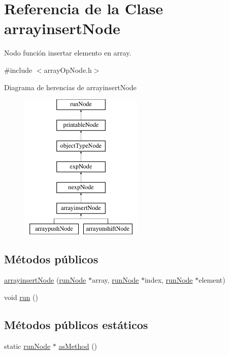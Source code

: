 \hypertarget{classarrayinsertNode}{\section{Referencia de la Clase arrayinsert\-Node}
\label{classarrayinsertNode}
}


Nodo función insertar elemento en array.  




{\ttfamily \#include $<$array\-Op\-Node.\-h$>$}

Diagrama de herencias de arrayinsert\-Node\begin{figure}[H]
\begin{center}
\leavevmode
\includegraphics[height=7.000000cm]{classarrayinsertNode}
\end{center}
\end{figure}
\subsection*{Métodos públicos}
\begin{DoxyCompactItemize}
\item 
\hyperlink{classarrayinsertNode_a018b6d84b64e515eea1016810ed335ac}{arrayinsert\-Node} (\hyperlink{classrunNode}{run\-Node} $\ast$array, \hyperlink{classrunNode}{run\-Node} $\ast$index, \hyperlink{classrunNode}{run\-Node} $\ast$element)
\item 
void \hyperlink{classarrayinsertNode_a1a72ddaf1ade1ee8a535ae1ca1fc2861}{run} ()
\end{DoxyCompactItemize}
\subsection*{Métodos públicos estáticos}
\begin{DoxyCompactItemize}
\item 
static \hyperlink{classrunNode}{run\-Node} $\ast$ \hyperlink{classarrayinsertNode_ab9edbaa7c002c24e3bedf5d2bd8ca5be}{as\-Method} ()
\end{DoxyCompactItemize}


